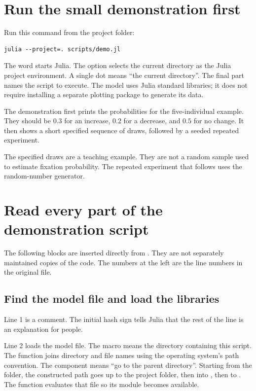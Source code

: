 \section{Run the small demonstration first}

Run this command from the project folder:
\begin{lstlisting}[language={},numbers=none]
julia --project=. scripts/demo.jl
\end{lstlisting}
The word  starts Julia. The option  selects
the current directory as the Julia project environment. A single dot means
``the current directory''. The final part names the script to execute.
The model uses Julia standard libraries; it does not require installing a
separate plotting package to generate its data.

The demonstration first prints the probabilities for the five-individual
example. They should be \(0.3\) for an increase, \(0.2\) for a decrease,
and \(0.5\) for no change. It then shows a short specified sequence of
draws, followed by a seeded repeated experiment.

The specified draws are a teaching example. They are not a random sample
used to estimate fixation probability. The repeated experiment that follows
uses the random-number generator.

\section{Read every part of the demonstration script}

The following blocks are inserted directly from .
They are not separately maintained copies of the code. The numbers at the
left are the line numbers in the original file.

\subsection{Find the model file and load the libraries}



Line 1 is a comment. The initial hash sign tells Julia that the rest of the
line is an explanation for people.

Line 2 loads the model file. The macro  means the directory
containing this script. The function  joins directory and
file names using the operating system's path convention. The component
 means ``go to the parent directory''. Starting from the
 folder, the constructed path goes up to the project folder,
then into , then to . The function
 evaluates that file so its module becomes available.

